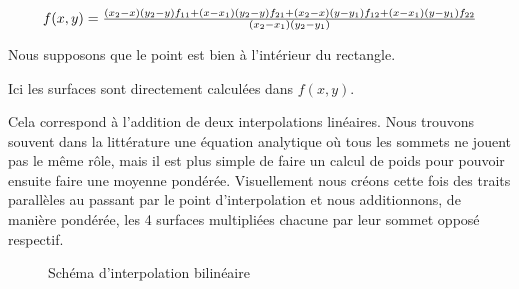 \begin{equation}
    \resizebox{0.9\hsize}{!}{$
    f(x, y) = \frac{(x_2 - x)(y_2 - y)f_{11} + (x - x_1)(y_2 - y)f_{21} + (x_2 - x)(y - y_1)f_{12} + (x - x_1)(y - y_1)f_{22}}{(x_2 - x_1)(y_2 - y_1)}
    $}
\end{equation}
                
Nous supposons que le point est bien à l'intérieur du rectangle.

Ici les surfaces sont directement calculées dans \(f(x, y)\).

Cela correspond à l'addition de deux interpolations linéaires. Nous trouvons souvent dans la littérature une équation analytique où tous les sommets ne jouent pas le même rôle, mais il est plus simple de faire un calcul de poids pour pouvoir ensuite faire une moyenne pondérée. 
Visuellement nous créons cette fois des traits parallèles au passant par le point d'interpolation et nous additionnons, de manière pondérée, les 4 surfaces multipliées chacune par leur sommet opposé respectif.

\begin{figure}[H]
    \centering
    \caption{Schéma d'interpolation bilinéaire}
\end{figure}


